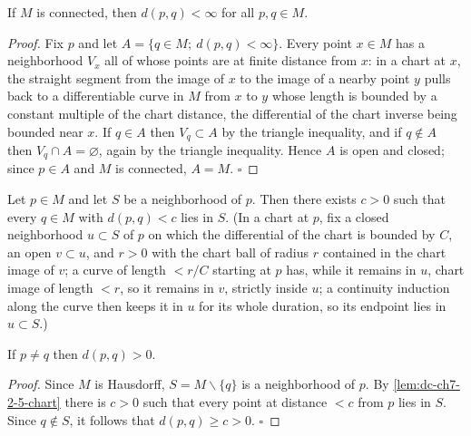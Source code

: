 \begin{lemma}
  \label{lem:dc-ch7-2-4-finite}
  \leanok
  If $M$ is connected, then $d(p,q)<\infty$ for all $p,q\in M$.
\end{lemma}
\begin{proof}
  \leanok
  Fix $p$ and let $A=\{q\in M;\ d(p,q)<\infty\}$. Every point $x\in M$ has a
  neighborhood $V_x$ all of whose points are at finite distance from $x$: in a
  chart at $x$, the straight segment from the image of $x$ to the image of a
  nearby point $y$ pulls back to a differentiable curve in $M$ from $x$ to $y$
  whose length is bounded by a constant multiple of the chart distance, the
  differential of the chart inverse being bounded near $x$. If $q\in A$ then
  $V_q\subset A$ by the triangle inequality, and if $q\notin A$ then
  $V_q\cap A=\varnothing$, again by the triangle inequality. Hence $A$ is open
  and closed; since $p\in A$ and $M$ is connected, $A=M$. $\square$
\end{proof}

\begin{lemma}
  \label{lem:dc-ch7-2-5-chart}
  \mathlibok
  Let $p\in M$ and let $S$ be a neighborhood of $p$. Then there exists $c>0$
  such that every $q\in M$ with $d(p,q)<c$ lies in $S$. (In a chart at $p$,
  fix a closed neighborhood $u\subset S$ of $p$ on which the differential of
  the chart is bounded by $C$, an open $v\subset u$, and $r>0$ with the chart
  ball of radius $r$ contained in the chart image of $v$; a curve of length
  $<r/C$ starting at $p$ has, while it remains in $u$, chart image of length
  $<r$, so it remains in $v$, strictly inside $u$; a continuity induction
  along the curve then keeps it in $u$ for its whole duration, so its
  endpoint lies in $u\subset S$.)
\end{lemma}

\begin{lemma}
  \label{lem:dc-ch7-2-5-pos}
  \leanok
  If $p\ne q$ then $d(p,q)>0$.
\end{lemma}
\begin{proof}
  \leanok
  Since $M$ is Hausdorff, $S=M\smallsetminus\{q\}$ is a neighborhood of $p$.
  By \cref{lem:dc-ch7-2-5-chart} there is $c>0$ such that every point at
  distance $<c$ from $p$ lies in $S$. Since $q\notin S$, it follows that
  $d(p,q)\ge c>0$. $\square$
\end{proof}

